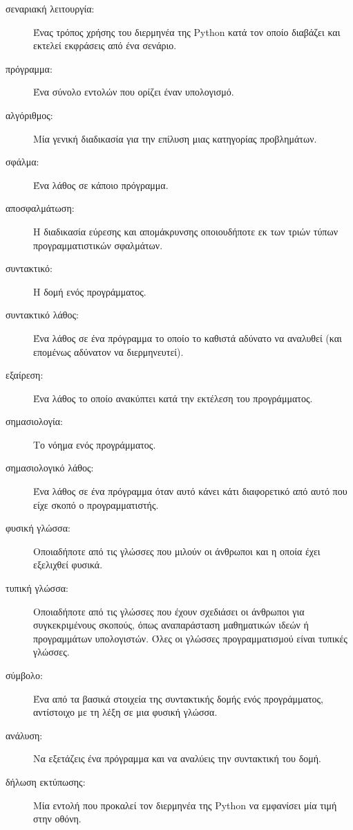 \documentclass[10pt]{book}
\begin{document}
\begin{description}
\item[σεναριακή λειτουργία:] Ένας τρόπος χρήσης του διερμηνέα της
	Python κατά τον οποίο διαβάζει και εκτελεί εκφράσεις από ένα σενάριο.

\item[πρόγραμμα:] Ένα σύνολο εντολών που ορίζει έναν υπολογισμό.

\item[αλγόριθμος:] Μία γενική διαδικασία για την επίλυση μιας κατηγορίας
	προβλημάτων.

\item[σφάλμα:] Ένα λάθος σε κάποιο πρόγραμμα.

\item[αποσφαλμάτωση:] Η διαδικασία εύρεσης και απομάκρυνσης οποιουδήποτε
	εκ των τριών τύπων προγραμματιστικών σφαλμάτων.

\item[συντακτικό:] Η δομή ενός προγράμματος.

\item[συντακτικό λάθος:] Ένα λάθος σε ένα πρόγραμμα το οποίο το καθιστά
	αδύνατο να αναλυθεί (και επομένως αδύνατον να διερμηνευτεί).

\item[εξαίρεση:] Ένα λάθος το οποίο ανακύπτει κατά την εκτέλεση του 
    προγράμματος.

\item[σημασιολογία:] Το νόημα ενός προγράμματος.

\item[σημασιολογικό λάθος:] Ένα λάθος σε ένα πρόγραμμα όταν αυτό 
	κάνει κάτι διαφορετικό από αυτό που είχε σκοπό ο προγραμματιστής.

\item[φυσική γλώσσα:] Οποιαδήποτε από τις γλώσσες που μιλούν οι άνθρωποι
	και η οποία έχει εξελιχθεί φυσικά.

\item[τυπική γλώσσα:] Οποιαδήποτε από τις γλώσσες που έχουν σχεδιάσει
	οι άνθρωποι για συγκεκριμένους σκοπούς, όπως αναπαράσταση μαθηματικών
	ιδεών ή προγραμμάτων υπολογιστών. Όλες οι γλώσσες προγραμματισμού είναι
	τυπικές γλώσσες.

\item[σύμβολο:] Ένα από τα βασικά στοιχεία της συντακτικής δομής ενός
	προγράμματος, αντίστοιχο με τη λέξη σε μια φυσική γλώσσα.

\item[ανάλυση:] Να εξετάζεις ένα πρόγραμμα και να αναλύεις την συντακτική
	του δομή.

\item[δήλωση εκτύπωσης:] Μία εντολή που προκαλεί τον διερμηνέα της
	Python να εμφανίσει μία τιμή στην οθόνη.


\end{description}
\end{document}
